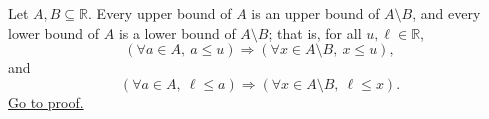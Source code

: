 \begin{corollary}
\label{cor:differences-inherit-bounds}
Let $A,B\subseteq\mathbb{R}$. Every upper bound of $A$ is an upper bound
of $A\setminus B$, and every lower bound of $A$ is a lower bound of
$A\setminus B$; that is, for all $u,\ell\in\mathbb{R}$,
\[
\left(\forall a\in A,\ a\leq u\right)
\Longrightarrow
(\forall x\in A\setminus B,\ x\leq u),
\]
and
\[
\left(\forall a\in A,\ \ell\leq a\right)
\Longrightarrow
(\forall x\in A\setminus B,\ \ell\leq x).
\]
\hyperref[prf:differences-inherit-bounds]{Go to proof.}
\end{corollary}
